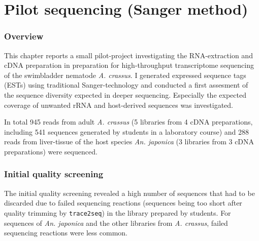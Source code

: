 
\chapter{Pilot sequencing (Sanger method)} %
\label{pilot-seq}


\ifpdf
    \graphicspath{{3_pilot/figures/PNG/}{3_pilot/figures/PDF/}{3_pilot/figures/}}
\else
    \graphicspath{{3_pilot/figures/EPS/}{3_pilot/figures/}}
\fi


\subsection{Overview}

This chapter reports a small pilot-project investigating the
RNA-extraction and cDNA preparation in preparation for high-throughput
transcriptome sequencing of the swimbladder nematode
\textit{A. crassus}. I generated expressed sequence tags (ESTs) using
traditional Sanger-technology and conducted a first assesment of the
sequence diversity expected in deeper sequencing. Especially the
expected coverage of unwanted rRNA and host-derived sequences was
investigated.

In total 945 reads from adult \textit{A. crassus} (5 libraries from 4
cDNA preparations, including 541 sequences generated by students in a
laboratory course) and 288 reads from liver-tissue of the host species
\textit{An. japonica} (3 libraries from 3 cDNA preparations) were
sequenced.

\subsection{Initial quality screening}
\label{qual-pil}

The initial quality screening revealed a high number of sequences that
had to be discarded due to failed sequencing reactions (sequences
being too short after quality trimming by \texttt{trace2seq}) in the
library prepared by students. For sequences of \textit{An. japonica}
and the other libraries from \textit{A. crassus}, failed sequencing
reactions were less common.

